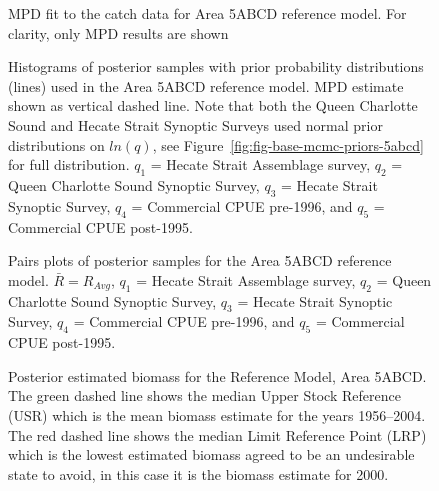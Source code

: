 \documentclass[11pt]{book}
\begin{document}
\begin{figure}[htb]

{\centering {} 

}

\caption{MPD fit to the catch data for Area 5ABCD reference model. For clarity, only MPD results are shown}\label{fig:fig-base-catch-fit-5abcd}
\end{figure}

\begin{figure}[htb]

{\centering {} 

}

\caption{Histograms of posterior samples with prior probability distributions (lines) used in the Area 5ABCD reference model. MPD estimate shown as vertical dashed line. Note that both the Queen Charlotte Sound and Hecate Strait Synoptic Surveys used normal prior distributions on \(ln(q)\), see Figure~\ref{fig:fig-base-mcmc-priors-5abcd} for full distribution. $q_1$ = Hecate Strait Assemblage survey, $q_2$ = Queen Charlotte Sound Synoptic Survey, $q_3$ = Hecate Strait Synoptic Survey, $q_4$ = Commercial CPUE pre-1996, and $q_5$ = Commercial CPUE post-1995.}\label{fig:fig-base-mcmc-priors-posts-5abcd}
\end{figure}
\begin{figure}[htb]

{\centering {} 

}

\caption{Pairs plots of posterior samples for the Area 5ABCD reference model. $\bar{R} = R_{Avg}$, $q_1$ = Hecate Strait Assemblage survey, $q_2$ = Queen Charlotte Sound Synoptic Survey, $q_3$ = Hecate Strait Synoptic Survey, $q_4$ = Commercial CPUE pre-1996, and $q_5$ = Commercial CPUE post-1995.}\label{fig:fig-base-mcmc-pairs-5abcd}
\end{figure}
\begin{figure}[htb]

{\centering {} 

}

\caption{Posterior estimated biomass for the Reference Model, Area 5ABCD.  The green dashed line shows the median Upper Stock Reference (USR) which is the mean biomass estimate for the years 1956--2004. The red dashed line shows the median Limit Reference Point (LRP) which is the lowest estimated biomass agreed to be an undesirable state to avoid, in this case it is the biomass estimate for 2000.}\label{fig:fig-base-biomass-5abcd}
\end{figure}
\end{document}
